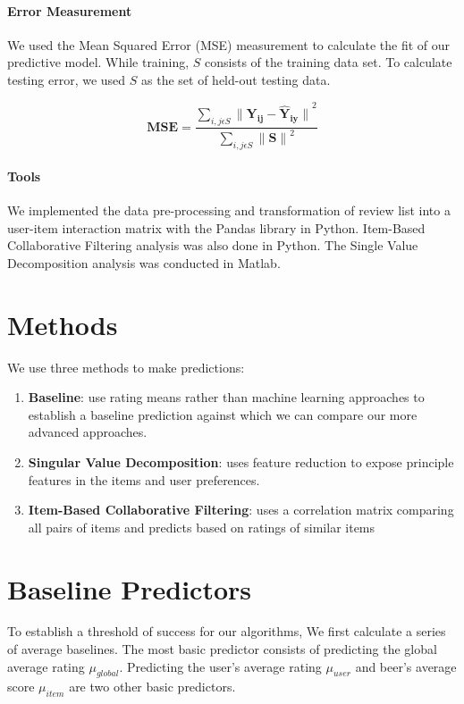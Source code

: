\documentclass[12pt]{article}
\begin{document}
\paragraph{Error Measurement}
We used the Mean Squared Error (MSE) measurement to calculate the fit of our predictive model. While training, $S$ consists of the training data set. To calculate testing error, we used $S$ as the set of held-out testing data.

$$ \mathbf{MSE} = \frac{\sum\limits_{i,j \epsilon S} {\mathbf{\|Y_{ij} - \hat{Y}_{iy}\|}}^2}{\sum\limits_{i,j \epsilon S}{\mathbf{\|S\|}}^2} $$

\paragraph{Tools}
We implemented the data pre-processing and transformation of review list into a user-item interaction matrix with the Pandas library in Python. Item-Based Collaborative Filtering analysis was also done in Python. The Single Value Decomposition analysis was conducted in Matlab.

\section{Methods}
We use three methods to make predictions:

\begin{enumerate}
  \item \textbf{Baseline}: use rating means rather than machine learning approaches to establish a baseline prediction against which we can compare our more advanced approaches.
  \item \textbf{Singular Value Decomposition}: uses feature reduction to expose principle features in the items and user preferences.
  \item \textbf{Item-Based Collaborative Filtering}: uses a correlation matrix comparing all pairs of items and predicts based on ratings of similar items
\end{enumerate}

\section{Baseline Predictors}
To establish a threshold of success for our algorithms, We first calculate a series of average baselines. The most basic predictor consists of predicting the global average rating $\mu_{global}$. Predicting the user's average rating $\mu_{user}$ and beer's average score $\mu_{item}$ are two other basic predictors.
\end{document}
